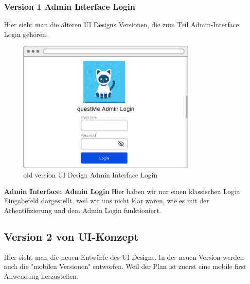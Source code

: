 \newpage

\subsubsection{Version 1 Admin Interface Login}
Hier sieht man die älteren UI Designs Versionen, die zum Teil Admin-Interface Login gehören.

\begin{figure}[H]
    \centering
    \includegraphics[width=0.8\textwidth]{bilder/old vers. UI Design/Admin Interface.png}
    \caption{old version UI Design Admin Interface Login}
    \label{fig:old version UI Design Admin Interface Login}
    \end{figure}
\noindent \textbf{Admin Interface: Admin Login} \newline
Hier haben wir nur einen klassischen Login Eingabefeld dargestellt, weil wir uns nicht klar waren, wie es mit der Athentifizierung und dem Admin
Login funktioniert.


\newpage

\subsection{Version 2 von UI-Konzept}
Hier sieht man die neuen Entwürfe des UI Designs. In der neuen Version werden auch die 
"mobilen Versionen" entworfen. Weil der Plan ist zuerst eine mobile first Anwendung herzustellen.

